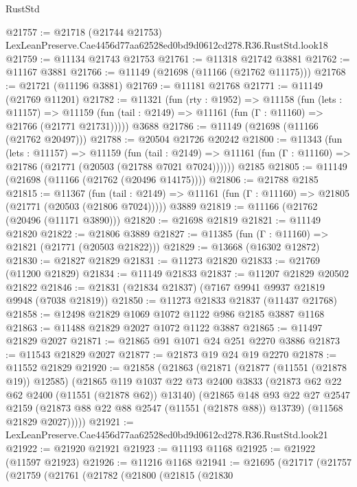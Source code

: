 \begin{lexlean}{RustStd}
\begin{coremodule}
@21757 := @21718
    (@21744 @21753)
    LexLeanPreserve.Cae4456d77aa62528ed0bd9d0612cd278.R36.RustStd.look18
@21759 := @11134 @21743 @21753
@21761 := @11318 @21742 @3881
@21762 := @11167 @3881
@21766 := @11149 (@21698 (@11166 (@21762 @11175)))
@21768 := @21721 (@11196 @3881)
@21769 := @11181 @21768
@21771 := @11149 (@21769 @11201)
@21782 := @11321
    (fun (rty : @1952) =>
    @11158
      (fun (lets : @11157) =>
      @11159 (fun (tail : @2149) => @11161 (fun (Γ : @11160) => @21766 (@21771 @21731)))))
    @3688
@21786 := @11149 (@21698 (@11166 (@21762 @20497)))
@21788 := @20504 @21726 @20242
@21800 := @11343
    (fun (lets : @11157) =>
    @11159
      (fun (tail : @2149) =>
      @11161 (fun (Γ : @11160) => @21786 (@21771 (@20503 (@21788 @7021 @7024))))))
    @2185
@21805 := @11149 (@21698 (@11166 (@21762 (@20496 @14175))))
@21806 := @21788 @2185
@21815 := @11367
    (fun (tail : @2149) => @11161 (fun (Γ : @11160) => @21805 (@21771 (@20503 (@21806 @7024)))))
    @3889
@21819 := @11166 (@21762 (@20496 (@11171 @3890)))
@21820 := @21698 @21819
@21821 := @11149 @21820
@21822 := @21806 @3889
@21827 := @11385 (fun (Γ : @11160) => @21821 (@21771 (@20503 @21822)))
@21829 := @13668 (@16302 @12872)
@21830 := @21827 @21829
@21831 := @11273 @21820
@21833 := @21769 (@11200 @21829)
@21834 := @11149 @21833
@21837 := @11207 @21829 @20502 @21822
@21846 := @21831 (@21834 @21837) (@7167 @9941 @9937 @21819 @9948 (@7038 @21819))
@21850 := @11273 @21833 @21837 (@11437 @21768)
@21858 := @12498 @21829 @1069 @1072 @1122 @986 @2185 @3887 @1168
@21863 := @11488 @21829 @2027 @1072 @1122 @3887
@21865 := @11497 @21829 @2027
@21871 := @21865 @91 @1071 @24 @251 @2270 @3886
@21873 := @11543 @21829 @2027
@21877 := @21873 @19 @24 @19 @2270
@21878 := @11552 @21829
@21920 := @21858
    (@21863
      (@21871
        (@21877 (@11551 (@21878 @19)) @12585)
        (@21865
          @119
          @1037
          @22
          @73
          @2400
          @3833
          (@21873 @62 @22 @62 @2400 (@11551 (@21878 @62)) @13140)
          (@21865
            @148
            @93
            @22
            @27
            @2547
            @2159
            (@21873 @88 @22 @88 @2547 (@11551 (@21878 @88)) @13739)
            (@11568 @21829 @2027)))))
@21921 := LexLeanPreserve.Cae4456d77aa62528ed0bd9d0612cd278.R36.RustStd.look21
@21922 := @21920 @21921
@21923 := @11193 @1168
@21925 := @21922 (@11597 @21923)
@21926 := @11216 @1168
@21941 := @21695
    (@21717
      (@21757
        (@21759
          (@21761
            (@21782
              (@21800
                (@21815
                  (@21830

\end{coremodule}
\end{lexlean}
